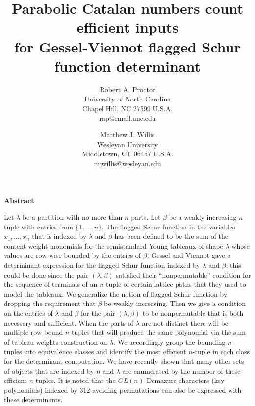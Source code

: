 \documentclass[11pt]{article}
\theoremstyle{definition}
\theoremstyle{remark}
\numberwithin{equation}{section}
\begin{document}
\title{Parabolic Catalan numbers count efficient inputs \\ for Gessel-Viennot flagged Schur function determinant}

\author{Robert A. Proctor \\ University of North Carolina \\ Chapel Hill, NC 27599 U.S.A. \\ rap@email.unc.edu \and Matthew J. Willis \\ Wesleyan University \\ Middletown, CT 06457 U.S.A. \\ mjwillis@wesleyan.edu}

\maketitle



\begingroup
    \fontsize{10pt}{12pt}\selectfont
    \begin{spacing}{1.1}

\centerline{\textbf{Abstract}}

\begin{adjustwidth*}{.5in}{.5in}


\vspace{1pc}Let $\lambda$ be a partition with no more than $n$ parts.  Let $\beta$ be a weakly increasing $n$-tuple with entries from $\{ 1, ... , n \}$.  The flagged Schur function in the variables $x_1, ... , x_n$ that is indexed by $\lambda$ and $\beta$ has been defined to be the sum of the content weight monomials for the semistandard Young tableaux of shape $\lambda$ whose values are row-wise bounded by the entries of $\beta$.  Gessel and Viennot gave a determinant expression for the flagged Schur function indexed by $\lambda$ and $\beta$; this could be done since the pair $(\lambda, \beta)$ satisfied their ``nonpermutable'' condition for the sequence of terminals of an $n$-tuple of certain lattice paths that they used to model the tableaux.  We generalize the notion of flagged Schur function by dropping the requirement that $\beta$ be weakly increasing.  Then we give a condition on the entries of $\lambda$ and $\beta$ for the pair $(\lambda, \beta)$ to be nonpermutable that is both necessary and sufficient.  When the parts of $\lambda$ are not distinct there will be multiple row bound $n$-tuples that will produce the same polynomial via the sum of tableau weights construction on $\lambda$.  We accordingly group the bounding $n$-tuples into equivalence classes and identify the most efficient $n$-tuple in each class for the determinant computation.  We have recently shown that many other sets of objects that are indexed by $n$ and $\lambda$ are enumerated by the number of these efficient $n$-tuples.  It is noted that the $GL(n)$ Demazure characters (key polynomials) indexed by 312-avoiding permutations can also be expressed with these determinants.

\end{adjustwidth*}



\end{spacing}
\end{document}

